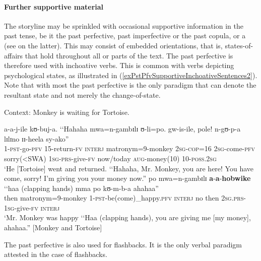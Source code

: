 \paragraph{Further supportive material}
\label{PastPFVNarrativeDiscourseSupportive}
The storyline may be sprinkled with occasional supportive information in the past tense, be it the past perfective, past imperfective or the past copula, or a  (see  on the latter). This may consist of embedded orientations, that is, states-of-affairs that hold throughout all or parts of the text. The past perfective is therefore used with inchoative verbs. This is common with verbs depicting psychological states, as illustrated in (\ref{exPstPfvSupportiveInchoativeSentences2}). Note that with most  the past perfective is the only paradigm that can denote the resultant state and not merely the change-of-state. 
\newpage
\begin{exe}
\ex Context: Monkey is waiting for Tortoise.

\begin{xlist}
\ex \gll a-a-j-ile kʊ-buj-a. \textup{\lq\lq}Hahaha mwa=n-gambɪlɪ ʊ-li=po. gw-is-ile, pole! n-gʊ-p-a lɪlɪno ɪɪ-heela sy-ako\textup{''}\\
1-\textsc{pst}-go-\textsc{pfv} 15-return-\textsc{fv} \phantom{\lq\lq}\textsc{interj} matronym=9-monkey \textsc{2sg}-\textsc{cop}=16 \textsc{2sg}-come-\textsc{pfv} sorry(<SWA) \textsc{1sg}-\textsc{prs}-give-\textsc{fv} now/today \textsc{aug}-money(10) 10-\textsc{poss.2sg}\\
\glt \lq He [Tortoise] went and returned. \lq\lq Hahaha, Mr. Monkey, you are here! You have come, sorry! I'm giving you your money now.''
\ex \label{exPstPfvSupportiveInchoativeSentences2}
 \gll po mwa=n-gambɪlɪ \textbf{a}-\textbf{a}-\textbf{hobwike} \textup{\lq\lq}haa \textup{(clapping hands)} mma po kʊ-m-b-a ahahaa\textup{''}\\
then matronym=9-monkey 1-\textsc{pst}-be(come)\_happy.\textsc{pfv}
\phantom{\lq\lq}\textsc{interj} {} no then \textsc{2sg.prs}-\textsc{1sg}-give-\textsc{fv} \textsc{interj}\\
\glt \lq Mr. Monkey was happy \lq\lq Haa (clapping hands), you are giving me [my money], ahahaa.'' [Monkey and Tortoise]
\end{xlist}
\end{exe}

The past perfective is also used for flashbacks. It is the only verbal paradigm attested in the case of flashbacks.

